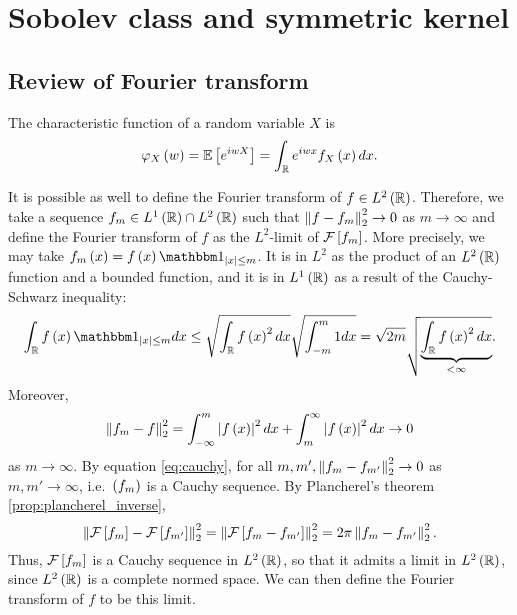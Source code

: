 \section{Sobolev class and symmetric kernel}
\subsection{Review of Fourier transform}
\begin{definition}
	The characteristic function of a random variable $X$ is
	\begin{equation*}
		\varphi_X\left(w\right) = \mathbb{E}\left[e^{iwX}\right] = \int_{\mathbb{R}} e^{iwx} f_X\left(x\right)dx.
	\end{equation*}
\end{definition}

\begin{remark}\label{rem:fourier_l2}
	It is possible as well to define the Fourier transform of $f\in L^2\left(\mathbb{R}\right)$. Therefore, we take a sequence $f_m \in L^1\left(\mathbb{R}\right)\cap L^2\left(\mathbb{R}\right)$ such that $\left\| f-f_m \right\|^2_2\rightarrow 0$ as $m\rightarrow \infty$ and define the Fourier transform of $f$ as the $L^2$-limit of $\mathcal{F} \left[f_m\right]$. More precisely, we may take $f_m\pa{x} = f\pa{x} \one_{\abs{x}\leq m}$. It is in $L^2$ as the product of an $L^2\left(\mathbb{R}\right)$ function and a bounded function, and it is in $L^1\left(\mathbb{R}\right)$ as a result of the Cauchy-Schwarz inequality:
	\begin{equation*}
		\int_{\R} f\pa{x} \one_{\abs{x}\leq m} dx \leq \sqrt{\int_{\R} f\pa{x}^2 dx } \sqrt{\int_{-m}^m 1 dx } = \sqrt{2m}  \sqrt{\underbrace{\int_{\R} f\pa{x}^2 dx}_{<\infty} }.
	\end{equation*}
	Moreover,
	\begin{equation}\label{eq:cauchy}
		\left\| f_m -f \right\|^2_2 = \int_{-\infty}^m \left| f\left(x\right)\right|^2 dx + \int_m^\infty \left| f\left(x\right)\right|^2 dx \rightarrow 0
	\end{equation}
	as $m\rightarrow \infty$.
By equation \ref{eq:cauchy}, for all $m,m', \left\| f_m -f_{m'} \right\|_2^2\rightarrow 0$ as $m,m'\rightarrow \infty$, i.e.~$\left(f_m\right)$ is a Cauchy sequence. By Plancherel's theorem \ref{prop:plancherel_inverse},
\begin{equation*}
    \left\| \mathcal{F} \left[f_m\right] -\mathcal{F}\left[f_{m'}\right]  \right\|_2^2 = \left\| \mathcal{F} \left[f_m -f_{m'} \right] \right\|_2^2 = 2\pi \left\| f_m -f_{m'} \right\|_2^2.
\end{equation*}
Thus, $\mathcal{F}\left[f_m\right]$ is a Cauchy sequence in $L^2\left(\mathbb{R}\right)$, so that it admits a limit in $L^2\left(\mathbb{R}\right)$, since $L^2\left(\mathbb{R}\right)$ is a complete normed space. We can then define the Fourier transform of $f$ to be this limit.
\end{remark}
